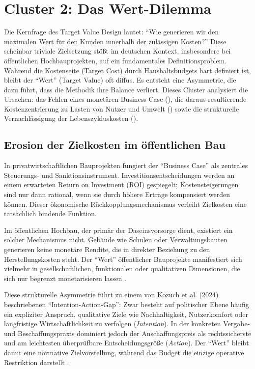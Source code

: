 \clearpage

\section{Cluster 2: Das Wert-Dilemma}
\label{sec:5.2}

Die Kernfrage des Target Value Design lautet: \enquote{Wie generieren wir den maximalen Wert für den Kunden innerhalb der zulässigen Kosten?}
Diese scheinbar triviale Zielsetzung stößt im deutschen Kontext, insbesondere bei öffentlichen Hochbauprojekten, auf ein fundamentales Definitionsproblem. Während die Kostenseite (Target Cost) durch Haushaltsbudgets hart definiert ist, bleibt der \enquote{Wert} (Target Value) oft diffus. Es entsteht eine Asymmetrie, die dazu führt, dass die Methodik ihre Balance verliert. Dieses Cluster analysiert die Ursachen: das Fehlen eines monetären Business Case (), die daraus resultierende Kostenzentrierung zu Lasten von Nutzer und Umwelt () sowie die strukturelle Vernachlässigung der Lebenszykluskosten ().

\subsection{Erosion der Zielkosten im öffentlichen Bau}
\label{sec:5.2.1}

In privatwirtschaftlichen Bauprojekten fungiert der \enquote{Business Case} als zentrales Steuerungs- und Sanktionsinstrument. Investitionsentscheidungen werden an einem erwarteten Return on Investment (\acs{ROI}) gespiegelt; Kostensteigerungen sind nur dann rational, wenn sie durch höhere Erträge kompensiert werden können. Dieser ökonomische Rückkopplungsmechanismus verleiht Zielkosten eine tatsächlich bindende Funktion.\autocite[Vgl.][S.~819 f]{miron_target_2015}

Im öffentlichen Hochbau, der primär der Daseinsvorsorge dient, existiert ein solcher Mechanismus nicht. Gebäude wie Schulen oder Verwaltungsbauten generieren keine monetäre Rendite, die in direkter Beziehung zu den Herstellungskosten steht. Der \enquote{Wert} öffentlicher Bauprojekte manifestiert sich vielmehr in gesellschaftlichen, funktionalen oder qualitativen Dimensionen, die sich nur begrenzt monetarisieren lassen \autocite[Vgl.][S.~819 f]{miron_target_2015}.

Diese strukturelle Asymmetrie führt zu einem von Kozuch et al. (2024) beschriebenen \enquote{Intention-Action-Gap}: Zwar besteht auf politischer Ebene häufig ein expliziter Anspruch, qualitative Ziele wie Nachhaltigkeit, Nutzerkomfort oder langfristige Wirtschaftlichkeit zu verfolgen (\textit{Intention}). In der konkreten Vergabe- und Beschaffungspraxis dominiert jedoch der Anschaffungspreis als rechtssicherste und am leichtesten überprüfbare Entscheidungsgröße (\textit{Action}). Der \enquote{Wert} bleibt damit eine normative Zielvorstellung, während das Budget die einzige operative Restriktion darstellt \autocite[Vgl.][S.~13 f]{kozuch_nachhaltigkeit_2024}.

